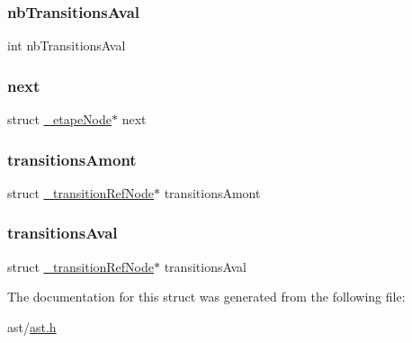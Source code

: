 \subsubsection{\texorpdfstring{nb\+Transitions\+Aval}{nbTransitionsAval}}
{\footnotesize\ttfamily int nb\+Transitions\+Aval}

\mbox{\label{struct__etape_node_a7612e1c7a3508d0016f935522a22bea3}} 
\subsubsection{\texorpdfstring{next}{next}}
{\footnotesize\ttfamily struct \hyperlink{struct__etape_node}{\+\_\+etape\+Node}$\ast$ next}

\mbox{\label{struct__etape_node_ab019a62049ce1847642f4e3953d88cba}} 
\subsubsection{\texorpdfstring{transitions\+Amont}{transitionsAmont}}
{\footnotesize\ttfamily struct \hyperlink{struct__transition_ref_node}{\+\_\+transition\+Ref\+Node}$\ast$ transitions\+Amont}

\mbox{\label{struct__etape_node_a0e3579f485181a5dcbcca301d24a2b74}} 
\subsubsection{\texorpdfstring{transitions\+Aval}{transitionsAval}}
{\footnotesize\ttfamily struct \hyperlink{struct__transition_ref_node}{\+\_\+transition\+Ref\+Node}$\ast$ transitions\+Aval}



The documentation for this struct was generated from the following file\+:\begin{DoxyCompactItemize}
\item 
ast/\hyperlink{ast_8h}{ast.\+h}\end{DoxyCompactItemize}
